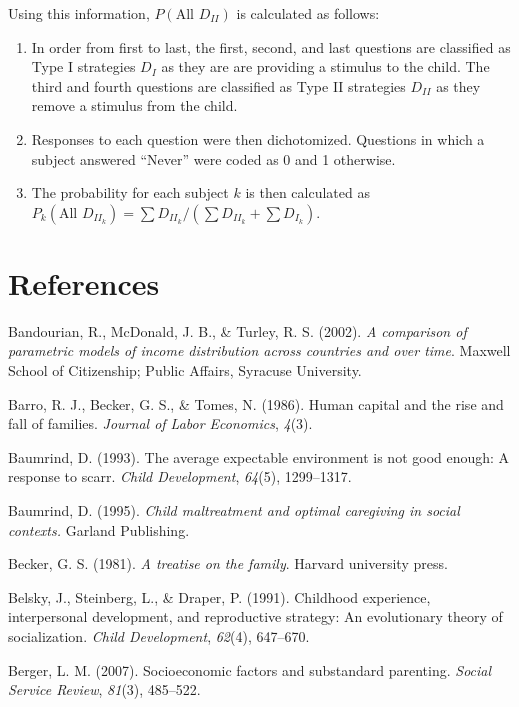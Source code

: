 \documentclass[]{elsarticle}
\begin{document}
Using this information, $P(\text{All } D_{II})$ is calculated as
follows:

\begin{enumerate}
\def\labelenumi{\arabic{enumi}.}
\itemsep1pt\parskip0pt
\item
  In order from first to last, the first, second, and last questions are
  classified as Type I strategies $D_I$ as they are are providing a
  stimulus to the child. The third and fourth questions are classified
  as Type II strategies $D_{II}$ as they remove a stimulus from the
  child.
\item
  Responses to each question were then dichotomized. Questions in which
  a subject answered ``Never'' were coded as 0 and 1 otherwise.
\item
  The probability for each subject $k$ is then calculated as\\
  $P_k(\text{All }D_{II_k})=\sum{D_{II_k}}/(\sum{D_{II_k}}+\sum{D_{I_k}})$.
\end{enumerate}

\section{References}\label{references}

Bandourian, R., McDonald, J. B., \& Turley, R. S. (2002). \emph{A
comparison of parametric models of income distribution across countries
and over time}. Maxwell School of Citizenship; Public Affairs, Syracuse
University.

Barro, R. J., Becker, G. S., \& Tomes, N. (1986). Human capital and the
rise and fall of families. \emph{Journal of Labor Economics},
\emph{4}(3).

Baumrind, D. (1993). The average expectable environment is not good
enough: A response to scarr. \emph{Child Development}, \emph{64}(5),
1299--1317.

Baumrind, D. (1995). \emph{Child maltreatment and optimal caregiving in
social contexts.} Garland Publishing.

Becker, G. S. (1981). \emph{A treatise on the family}. Harvard
university press.

Belsky, J., Steinberg, L., \& Draper, P. (1991). Childhood experience,
interpersonal development, and reproductive strategy: An evolutionary
theory of socialization. \emph{Child Development}, \emph{62}(4),
647--670.

Berger, L. M. (2007). Socioeconomic factors and substandard parenting.
\emph{Social Service Review}, \emph{81}(3), 485--522.
\end{document}

